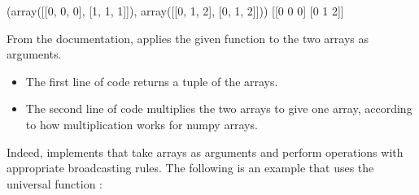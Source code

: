\documentclass[letterpaper,10pt,english]{sphinxmanual}
\begin{document}
\begin{sphinxVerbatim}[commandchars=\\\{\}]
   
   
\end{sphinxVerbatim}

\begin{sphinxVerbatim}[commandchars=\\\{\}]
(array([[0, 0, 0],
       [1, 1, 1]]), array([[0, 1, 2],
       [0, 1, 2]]))
[[0 0 0]
 [0 1 2]]
\end{sphinxVerbatim}

From the documentation,  applies the given function to the two arrays as arguments.
\begin{itemize}
\item {} 
The first line of code returns a tuple of the arrays.

\item {} 
The second line of code multiplies the two arrays to give one array, according to how multiplication works for numpy arrays.

\end{itemize}

Indeed,  implements  that take arrays as arguments and perform operations with appropriate broadcasting rules. The following is an example that uses the universal function :
\end{document}
